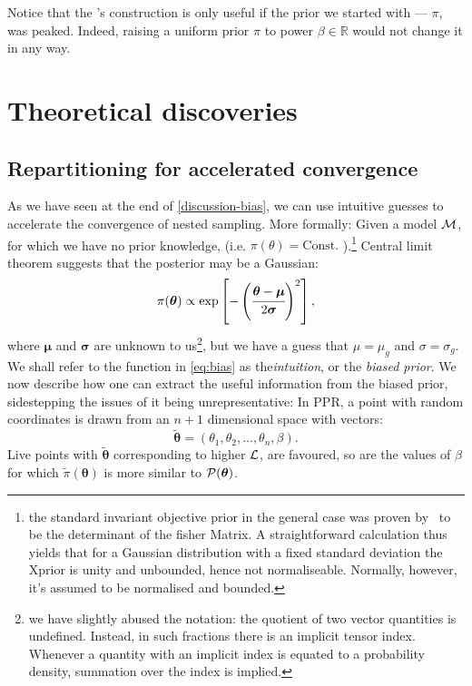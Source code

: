 \documentclass[usenatbib]{mnras}
\begin{document}
Notice that the \citeauthor{chen-ferroz-hobson}'s construction is
only useful if the prior we started with --- \(\pi\), was
peaked. Indeed, raising a uniform prior \(\pi\) to power \(\beta \in
   \mathbb{R}\) would not change it in any way.

\section{Theoretical discoveries}
\subsection{Repartitioning for  accelerated convergence\label{sec:accelerating}}

As we have seen at the end of \cref{discussion-bias}, we can use
intuitive guesses to accelerate the convergence of nested
sampling. More formally: Given a model \({\cal M}\), for which we have
no prior knowledge, (i.e. \(\pi(\theta) = \text{Const.}\)
).\footnote{the standard invariant objective prior in the general case
  was proven by~\cite{JeffreysPrior} to be the determinant of the
  fisher Matrix. A straightforward calculation thus yields that for a
  Gaussian distribution with a fixed standard deviation the Xprior is
  unity and unbounded, hence not normaliseable. Normally, however,
  it's assumed to be normalised and bounded.} Central limit theorem
suggests that the posterior may be a Gaussian:
\begin{equation}
 \pi (\bm{\theta}) \propto \exp \left[-\left(\cfrac{\bm{\theta} - \bm{\mu}}{2\bm{\sigma}}\right)^{2} \right],
 \label{eq:bias}
\end{equation}
where \(\bm{\mu}\) and \(\bm{\sigma}\) are unknown to us\footnote{we
  have slightly abused the notation: the quotient of two vector
  quantities is undefined. Instead, in such fractions there is an
  implicit tensor index. Whenever a quantity with an implicit index is
  equated to a probability density, summation over the index is
  implied.}, but we have a guess that $\mu=\mu_{g}$ and
$\sigma=\sigma_{g}$. We shall refer to the function in \cref{eq:bias}
as the\emph{intuition}, or the \emph{biased prior}. We now describe
how one can extract the useful information from the biased prior,
sidestepping the issues of it being unrepresentative: In PPR, a point
with random coordinates is drawn from an \(n+1\) dimensional space
with vectors:
\begin{equation}
  \tilde{\bm{\theta}} = (\theta_{1}, \theta_{2}, \ldots, \theta_{n}, \beta). 
\end{equation}
Live points with $\tilde{\bm{\theta}}$ corresponding to higher
${\cal L}$, are favoured, so are the values of $\beta$ for which
$\tilde{\pi}(\bm{\theta})$ is more similar to ${\cal P}(\bm{\theta})$.
\end{document}

